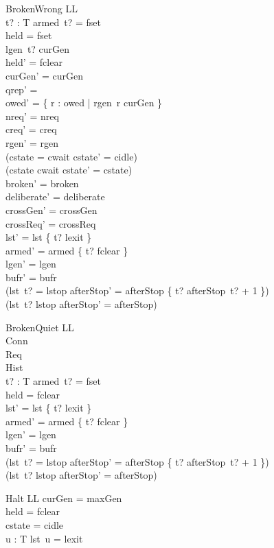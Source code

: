 \documentclass[a4paper,10pt,fleqn]{article}
\begin{document}
\begin{schema}{BrokenWrong}
  \Delta LL \\
  t? : T
\where
  armed~t? = fset \\
  held = fset \\
  lgen~t? \neq curGen \\
  held' = fclear \\
  curGen' = curGen \\
  qrep' = \emptyset \\
  owed' = \{ r : owed | rgen~r \neq curGen \} \\
  nreq' = nreq \\
  creq' = creq \\
  rgen' = rgen \\
  (cstate = cwait \implies cstate' = cidle) \\
  (cstate \neq cwait \implies cstate' = cstate) \\
  broken' = broken \\
  deliberate' = deliberate \\
  crossGen' = crossGen \\
  crossReq' = crossReq \\
  lst' = lst \oplus \{ t? \mapsto lexit \} \\
  armed' = armed \oplus \{ t? \mapsto fclear \} \\
  lgen' = lgen \\
  bufr' = bufr \\
  (lst~t? = lstop \implies
    afterStop' = afterStop \oplus \{ t? \mapsto afterStop~t? + 1 \}) \\
  (lst~t? \neq lstop \implies afterStop' = afterStop)
\end{schema}

\begin{schema}{BrokenQuiet}
  \Delta LL \\
  \Xi Conn \\
  \Xi Req \\
  \Xi Hist \\
  t? : T
\where
  armed~t? = fset \\
  held = fclear \\
  lst' = lst \oplus \{ t? \mapsto lexit \} \\
  armed' = armed \oplus \{ t? \mapsto fclear \} \\
  lgen' = lgen \\
  bufr' = bufr \\
  (lst~t? = lstop \implies
    afterStop' = afterStop \oplus \{ t? \mapsto afterStop~t? + 1 \}) \\
  (lst~t? \neq lstop \implies afterStop' = afterStop)
\end{schema}

\begin{schema}{Halt}
  \Xi LL
\where
  curGen = maxGen \\
  held = fclear \\
  cstate = cidle \\
  \forall u : T \spot lst~u = lexit
\end{schema}
\end{document}
